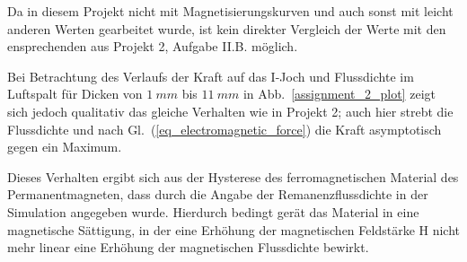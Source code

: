 \documentclass[conference,a4paper,twoside]{IEEEtran}
\begin{document}
Da in diesem Projekt nicht mit Magnetisierungskurven und auch sonst mit leicht anderen Werten gearbeitet wurde, ist kein direkter Vergleich der Werte mit den ensprechenden aus Projekt 2, Aufgabe II.B. möglich.

Bei Betrachtung des Verlaufs der Kraft auf das I-Joch und Flussdichte im Luftspalt für Dicken von $1\ mm$ bis $11\ mm$ in Abb.~\ref{assignment_2_plot} zeigt sich jedoch qualitativ das gleiche Verhalten wie in Projekt 2; auch hier strebt die Flussdichte und nach Gl.~(\ref{eq_electromagnetic_force}) die Kraft asymptotisch gegen ein Maximum.

Dieses Verhalten ergibt sich aus der Hysterese des ferromagnetischen Material des Permanentmagneten, dass durch die Angabe der Remanenzflussdichte in der Simulation angegeben wurde. Hierdurch bedingt gerät das Material in eine magnetische Sättigung, in der eine Erhöhung der magnetischen Feldstärke H nicht mehr linear eine Erhöhung der magnetischen Flussdichte bewirkt.
\end{document}
